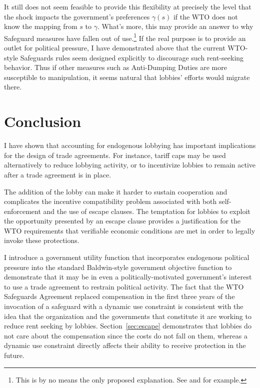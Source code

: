 \documentclass[12pt]{article}
\newcommand{\ga}{\gamma}
\begin{document}
It still does not seem feasible to provide this flexibility at precisely the level that the shock impacts the government's preferences $\ga(s)$ if the WTO does not know the mapping from $s$ to $\ga$. What's more, this may provide an answer to why Safeguard measures have fallen out of use.\footnote{This is by no means the only proposed explanation. See \Textcite{bown2002s} and \Textcite{sykes2003} for example.} If the real purpose is to provide an outlet for political pressure, I have demonstrated above that the current WTO-style Safeguards rules seem designed explicitly to discourage such rent-seeking behavior. Thus if other measures such as Anti-Dumping Duties are more susceptible to manipulation, it seems natural that lobbies' efforts would migrate there.

	


%

\section{Conclusion}
\label{sec:concl}
I have shown that accounting for endogenous lobbying has important implications for the design of trade agreements. For instance, tariff caps may be used alternatively to reduce lobbying activity, or to incentivize lobbies to remain active after a trade agreement is in place.

The addition of the lobby can make it harder to sustain cooperation and complicates the incentive compatibility problem associated with both self-enforcement and the use of escape clauses. The temptation for lobbies to exploit the opportunity presented by an escape clause provides a justification for the WTO requirements that verifiable economic conditions are met in order to legally invoke these protections.

I introduce a government utility function that incorporates endogenous political pressure into the standard Baldwin-style government objective function to demonstrate that it may be in even a politically-motivated government's interest to use a trade agreement to restrain political activity. The fact that the WTO Safeguards Agreement replaced compensation in the first three years of the invocation of a safeguard with a dynamic use constraint is consistent with the idea that the organization and the governments that constitute it are working to reduce rent seeking by lobbies. Section~\ref{sec:escape} demonstrates that lobbies do not care about the compensation since the costs do not fall on them, whereas a dynamic use constraint directly affects their ability to receive protection in the future.
\end{document}
